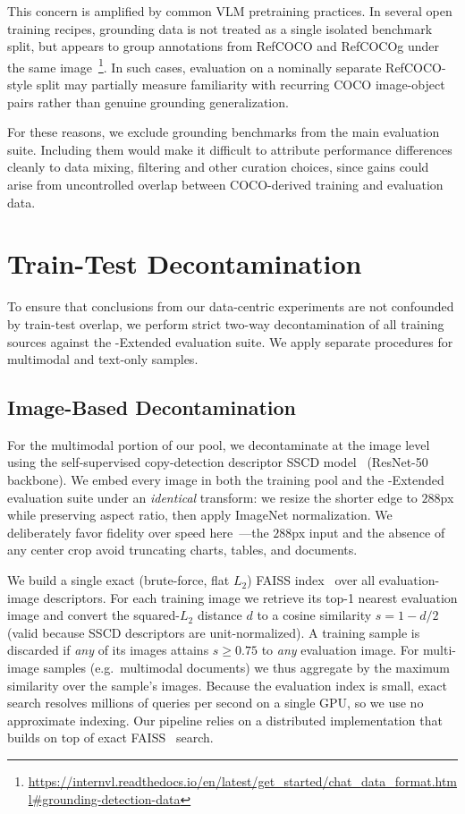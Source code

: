 This concern is amplified by common VLM pretraining practices. In several open training
recipes, grounding data is not treated as a single isolated benchmark split, but appears to group annotations from RefCOCO and RefCOCOg under the same
image~\footnote{\url{https://internvl.readthedocs.io/en/latest/get_started/chat_data_format.html\#grounding-detection-data}}. In such cases, evaluation on a nominally separate
RefCOCO-style split may partially measure familiarity with recurring COCO
image-object pairs rather than genuine grounding generalization.

For these reasons, we exclude grounding benchmarks from the main \dcvlm evaluation
suite. Including them would make it difficult to attribute performance differences
cleanly to data mixing, filtering and other curation choices, since gains could arise from uncontrolled overlap between COCO-derived training and evaluation data.
\clearpage

\section{Train-Test Decontamination}\label{app:decontamination}
To ensure that conclusions from our data-centric experiments are not confounded by train-test overlap, we perform strict two-way decontamination of all training sources against the \dcvlm-Extended evaluation suite.
We apply separate procedures for multimodal and text-only samples.

\subsection{Image-Based Decontamination}\label{appsub:image-decont}
For the multimodal portion of our pool, we decontaminate at the image level using the self-supervised copy-detection descriptor SSCD model~\citep{pizzi2022self} (ResNet-50 backbone). We embed every image in both the training pool and the \dcvlm-Extended evaluation suite under an \emph{identical} transform: we resize the shorter edge to $288$px while preserving aspect ratio, then apply ImageNet normalization. We deliberately favor fidelity over speed here~\citep{beyer2024vitspeed}---the $288$px input and the absence of any center crop avoid truncating charts, tables, and documents.

We build a single exact (brute-force, flat $L_2$) FAISS index~\citep{douze2025faiss} over all evaluation-image descriptors. For each training image we retrieve its top-1 nearest evaluation image and convert the squared-$L_2$ distance $d$ to a cosine similarity $s = 1 - d/2$ (valid because SSCD descriptors are unit-normalized). 
A training sample is discarded if \emph{any} of its images attains $s \geq 0.75$ to \emph{any} evaluation image. For multi-image samples (e.g.\ multimodal documents) we thus aggregate by the maximum similarity over the sample's images. Because the evaluation index is small, exact search resolves millions of queries per second on a single GPU, so we use no approximate indexing. Our pipeline relies on a distributed implementation that builds on top of exact FAISS~\cite{douze2025faiss} search.

